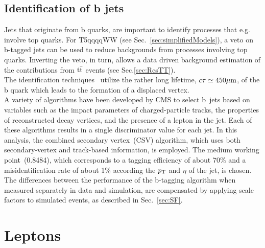\subsection{Identification of b jets}
\label{sec:btagging}
Jets that originate from b quarks, are important to identify processes that e.g. involve top quarks. For T5qqqqWW  (see Sec.~\ref{sec:simplifiedModels}), a veto on b-tagged jets can be used to reduce backgrounds from processes involving top quarks. Inverting the veto, in turn, allows a data driven background estimation of the contributions from $\rm t\bar{t}$ events (see Sec.\ref{sec:RcsTT}).
\\
The identification techniques~\cite{btagging,btagging2} utilize the rather long lifetime, $c\tau\simeq \rm 450 \mu m$, of the b quark which leads to the formation of a displaced vertex.\\
A variety of algorithms have been developed by CMS to select b~jets based on variables such as the impact parameters of charged-particle tracks, the properties of reconstructed decay vertices, and the presence of a lepton in the jet. Each of these algorithms results in a single discriminator value for each jet.
In this analysis, the combined secondary vertex~(CSV) algorithm, which uses both secondary-vertex and track-based information, is employed. The medium working point~(0.8484), which corresponds to a tagging efficiency of about 70\% and a misidentification rate of about 1\% according the $p_{\rm T}$ and $\eta$ of the jet, is chosen.\\
The differences between the performance of the b-tagging algorithm when measured separately in data and simulation, are compensated by applying scale factors to simulated events, as described in Sec.~\ref{sec:SF}.
\section{Leptons}
\label{sec:PFleptons}
